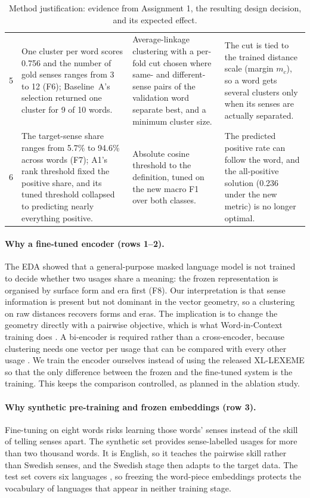 \begin{table}[t]
\begin{tabularx}{\textwidth}{@{}p{}XXX@{}}
5 & One cluster per word scores 0.756 and the number of gold senses ranges from 3 to 12 (F6); Baseline~A's selection returned one cluster for 9 of 10 words. & Average-linkage clustering with a per-fold cut chosen where same- and different-sense pairs of the validation word separate best, and a minimum cluster size. & The cut is tied to the trained distance scale (margin $m_c$), so a word gets several clusters only when its senses are actually separated.\\
6 & The target-sense share ranges from 5.7\% to 94.6\% across words (F7); A1's rank threshold fixed the positive share, and its tuned threshold collapsed to predicting nearly everything positive. & Absolute cosine threshold to the definition, tuned on the new macro F1 over both classes. & The predicted positive rate can follow the word, and the all-positive solution (0.236 under the new metric) is no longer optimal.\\
\bottomrule
\end{tabularx}
\caption{Method justification: evidence from Assignment 1, the resulting design decision, and its expected effect.}
\label{tab:justification}
\end{table}

\paragraph{Why a fine-tuned encoder (rows 1--2).} The EDA showed that a general-purpose
masked language model is not trained to decide whether two usages share a meaning:
the frozen representation is organised by surface form and era first (F8). Our interpretation
is that sense information is present but not dominant in the vector geometry,
so a clustering on raw distances recovers forms and eras. The implication is to change the
geometry directly with a pairwise objective, which is what Word-in-Context training does
\citep{pilehvar2019wic,cassotti2023xllexeme}. A bi-encoder is required rather than a
cross-encoder, because clustering needs one vector per usage that can be compared with every
other usage \citep{reimers2019sbert}. We train the encoder ourselves instead of using the
released XL-LEXEME so that the only difference between the frozen and the fine-tuned system is
the training. This keeps the comparison controlled, as planned in the ablation study.

\paragraph{Why synthetic pre-training and frozen embeddings (row 3).} Fine-tuning on eight words
risks learning those words' senses instead of the skill of telling senses apart. The synthetic
set provides sense-labelled usages for more than two thousand words. It is English, so it
teaches the pairwise skill rather than Swedish senses, and the Swedish stage then adapts to the
target data. The test set covers six languages \citep{tahmasebi2026semeval}, so freezing the
word-piece embeddings protects the vocabulary of languages that appear in neither training stage.

